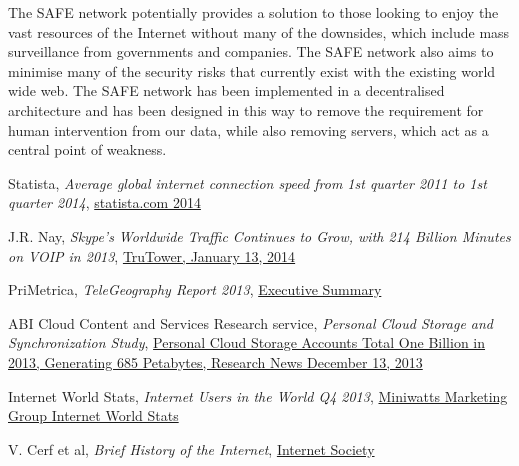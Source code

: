 \documentclass[twocolumn,english]{article}
\begin{document}
The SAFE network potentially provides a solution to those looking
to enjoy the vast resources of the Internet without many of the downsides,
which include mass surveillance from governments and companies. The SAFE
network also aims to minimise many of the security risks that currently
exist with the existing world wide web. The SAFE network has been implemented
in a decentralised architecture and has been designed in this way
to remove the requirement for human intervention from our data, while
also removing servers, which act as a central point of weakness.


\begin{thebibliography}{9}

 Statista, \emph{Average global internet connection speed from 1st quarter 2011 to 1st quarter 2014}, \href{http://www.statista.com/statistics/204954/average-internet-connection-speed-worldwide/}{statista.com 2014}

 J.R. Nay, \emph{Skype's Worldwide Traffic Continues to Grow, with 214 Billion Minutes on VOIP in 2013}, \href{http://www.trutower.com/2014/01/13/skype-voip-app-calling-statistics-telegeography/}{TruTower, January 13, 2014}

 PriMetrica, \emph{TeleGeography Report 2013}, \href{http://www.telegeography.com/page_attachments/products/website/research-services/telegeography-report-database/0004/6341/TG_executive_summary.pdf}{Executive Summary}


 ABI Cloud Content and Services Research service, \emph{Personal Cloud Storage and Synchronization Study}, \href{https://www.abiresearch.com/press/personal-cloud-storage-accounts-total-one-billion-}{Personal Cloud Storage Accounts Total One Billion in 2013, Generating 685 Petabytes, Research News December 13, 2013}

 Internet World Stats, \emph{Internet Users in the World Q4 2013}, \href{http://www.internetworldstats.com/stats.htm}{Miniwatts Marketing Group Internet World Stats}

 V. Cerf et al, \emph{Brief History of the Internet}, \href{http://www.internetsociety.org/internet/what-internet/history-internet/brief-history-internet}{Internet Society}


\end{thebibliography}
\end{document}
